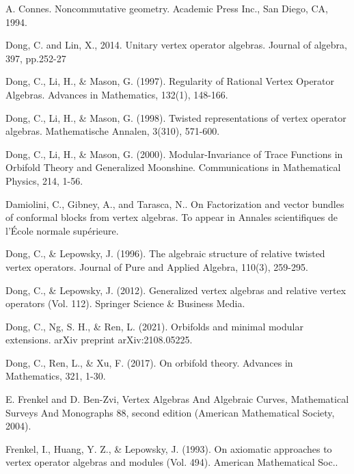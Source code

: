 \documentclass[11pt,b5paper,notitlepage]{article}
\theoremstyle{definition}
\theoremstyle{plain}
\numberwithin{equation}{section}
\begin{document}
\begin{thebibliography}{999999}
A. Connes. Noncommutative geometry. Academic Press Inc., San Diego, CA, 1994.



Dong, C. and Lin, X., 2014. Unitary vertex operator algebras. Journal of algebra, 397, pp.252-27



Dong, C., Li, H., \& Mason, G. (1997). Regularity of Rational Vertex Operator Algebras. Advances in Mathematics, 132(1), 148-166.

Dong, C., Li, H., \& Mason, G. (1998). Twisted representations of vertex operator algebras. Mathematische Annalen, 3(310), 571-600.

Dong, C., Li, H., \& Mason, G. (2000). Modular-Invariance of Trace Functions in Orbifold Theory and Generalized Moonshine. Communications in Mathematical Physics, 214, 1-56.




Damiolini, C., Gibney, A., and Tarasca, N.. On Factorization and vector bundles of conformal blocks from vertex algebras. To appear in Annales scientifiques de l’École normale supérieure.


Dong, C., \& Lepowsky, J. (1996). The algebraic structure of relative twisted vertex operators. Journal of Pure and Applied Algebra, 110(3), 259-295.

Dong, C., \& Lepowsky, J. (2012). Generalized vertex algebras and relative vertex operators (Vol. 112). Springer Science \& Business Media.


Dong, C., Ng, S. H., \& Ren, L. (2021). Orbifolds and minimal modular extensions. arXiv preprint arXiv:2108.05225.


Dong, C., Ren, L., \& Xu, F. (2017). On orbifold theory. Advances in Mathematics, 321, 1-30.







E. Frenkel and D. Ben-Zvi, Vertex Algebras And Algebraic Curves, Mathematical Surveys And Monographs 88, second edition (American Mathematical Society, 2004).


Frenkel, I., Huang, Y. Z., \& Lepowsky, J. (1993). On axiomatic approaches to vertex operator algebras and modules (Vol. 494). American Mathematical Soc..



\end{thebibliography}
\end{document}
